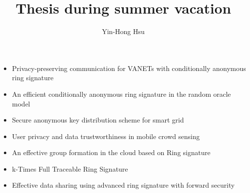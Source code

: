 \documentclass[journal]{IEEEtran}
\begin{document}
\title{Thesis during summer vacation}


\author{Yin-Hong Hsu}

\maketitle





%
\IEEEpeerreviewmaketitle
\begin{itemize}
    \item {Privacy-preserving communication for {VANETs} with conditionally anonymous ring signature}
    \item {An efficient conditionally anonymous ring signature in the random oracle model}
    \item {Secure anonymous key distribution scheme for smart grid}
    \item {User privacy and data trustworthiness in mobile crowd sensing}
    \item {An effective group formation in the cloud based on Ring signature}
    \item {k-Times Full Traceable Ring Signature}
    \item {Effective data sharing using advanced ring signature with forward security}
\end{itemize}
~\cite{zeng2015privacy}
~\cite{zeng2012efficient}
~\cite{tsai2016secure}
~\cite{he2015user}
~\cite{dhivya2015effective}
~\cite{bultel2016k}
~\cite{chandanapriya2016effective}
% 
% 
% 


{\footnotesize
}


\end{document}
